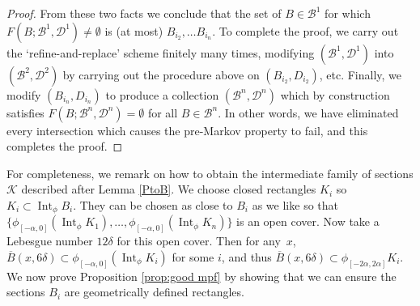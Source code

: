 \documentclass[11pt]{article}
\let\mathcal\mathscr
\theoremstyle{definition}
\numberwithin{equation}{section}
\DeclareMathOperator{\Int}{Int}
\newcommand\KKK{\mathcal K}
\newcommand\BBB{\mathcal B}
\begin{document}
\begin{proof}
From these two facts we conclude that the set of $B\!\in\!\mathcal{B}^1$ for which \hbox{$F(B;\mathcal{B}^1,\mathcal{D}^1)\!\neq\!\emptyset$} is (at most) $B_{i_2}, \ldots B_{i_n}$. To complete the proof, we carry out the `refine-and-replace' scheme finitely many times, modifying $(\mathcal{B}^1, \mathcal{D}^1)$ into $(\mathcal{B}^2, \mathcal{D}^2)$ by carrying out the procedure above on $(B_{i_2}, D_{i_2})$, etc. Finally, we modify $(B_{i_n}, D_{i_n})$ to produce a collection $(\mathcal{B}^n, \mathcal{D}^n)$ which by construction satisfies $F(B; \mathcal{B}^n,\mathcal{D}^n) = \emptyset$ for all $B \in \BBB^n$. In other words, we have eliminated every intersection which causes the pre-Markov property to fail, and this completes the proof.
\end{proof}

For completeness, we remark on how to obtain the intermediate family of sections $\KKK$ described after Lemma \ref{PtoB}. We choose closed rectangles $K_i$ so $K_i \subset \Int_\phi B_i$. They can be chosen as close to $B_i$ as we like so that $\{\phi_{[-\alpha, 0]} (\Int_\phi K_1), \ldots, \phi_{[-\alpha, 0]} (\Int_\phi K_n)\}$ is an open cover. Now take a Lebesgue number $12 \delta$ for this open cover. Then for any~$x$, $\overline B(x, 6\delta) \subset \phi_{[-\alpha, 0]} (\Int_\phi K_i)$ for some $i$, and thus $\overline B(x, 6\delta) \subset \phi_{[-2 \alpha, 2 \alpha]}K_i$. We now prove Proposition \ref{prop:good mpf} by showing that we can ensure the sections $B_i$ are geometrically defined rectangles.
\end{document}
